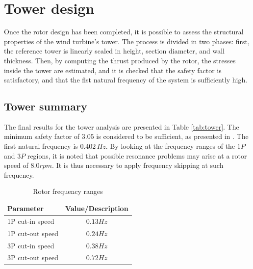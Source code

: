 \section{Tower design}

Once the rotor design has been completed, it is possible to assess the structural properties of the wind turbine's tower. The process is divided in two phases: first, the reference tower is linearly scaled in height, section diameter, and wall thickness. Then, by computing the thrust produced by the rotor, the stresses inside the tower are estimated, and it is checked that the safety factor is satisfactory, and that the fist natural frequency of the system is sufficiently high.

\subsection{Tower summary}

The final results for the tower analysis are presented in Table \ref{tab:tower}. The minimum safety factor of $3.05$ is considered to be sufficient, as presented in \cite{NREL_tower}.
The first natural frequency is $0.402\,Hz$. By looking at the frequency ranges of the $1P$ and $3P$ regions, it is noted that possible resonance problems may arise at a rotor speed of $8.0 rpm$. It is thus necessary to apply frequency skipping at such frequency.

\begin{table}[H]
\begin{center} 
\caption{Rotor frequency ranges}\label{tab:freq_ranges}
\begin{tabular}{ |l|c| } 
\hline
\textbf{Parameter} & \textbf{Value/Description}  \\ 
\hline
1P cut-in speed & $0.13 Hz$ \\ 
\hline
1P cut-out speed & $0.24 Hz$ \\ 
\hline
3P cut-in speed & $0.38 Hz$ \\ 
\hline
3P cut-out speed & $0.72 Hz$ \\ 
\hline
\end{tabular} \\
\end{center}
\end{table}


